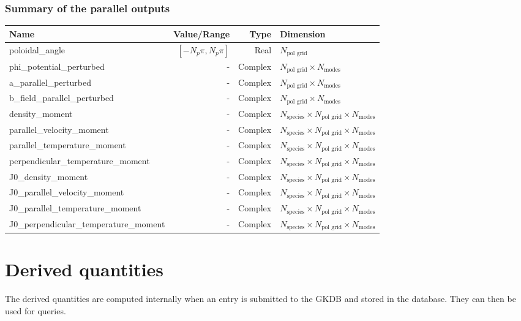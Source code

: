\documentclass[a4paper]{report}
\begin{document}
\subsection{Summary of the parallel outputs}
\begin{tabularx}{\textwidth}{|L|R|R|Y|}
\hline
Name & Value/Range & Type & Dimension \\
\hline
poloidal\_angle & $[-N_p\pi,N_p\pi]$ & Real & $N_\textrm{pol grid}$\\
phi\_potential\_perturbed & - & Complex & $N_\textrm{pol grid}\times N_\textrm{modes}$\\
a\_parallel\_perturbed & - & Complex & $N_\textrm{pol grid}\times N_\textrm{modes}$\\
b\_field\_parallel\_perturbed & - & Complex & $N_\textrm{pol grid}\times N_\textrm{modes}$\\ 
density\_moment & - & Complex & $N_\textrm{species}\times N_\textrm{pol grid}\times N_\textrm{modes}$\\
parallel\_velocity\_moment & - & Complex & $N_\textrm{species}\times N_\textrm{pol grid}\times N_\textrm{modes}$\\
parallel\_temperature\_moment & - & Complex & $N_\textrm{species}\times N_\textrm{pol grid}\times N_\textrm{modes}$\\
perpendicular\_temperature\_moment & - & Complex & $N_\textrm{species}\times N_\textrm{pol grid}\times N_\textrm{modes}$\\
J0\_density\_moment & - & Complex & $N_\textrm{species}\times N_\textrm{pol grid}\times N_\textrm{modes}$\\
J0\_parallel\_velocity\_moment & - & Complex & $N_\textrm{species}\times N_\textrm{pol grid}\times N_\textrm{modes}$\\
J0\_parallel\_temperature\_moment & - & Complex & $N_\textrm{species}\times N_\textrm{pol grid}\times N_\textrm{modes}$\\
J0\_perpendicular\_temperature\_moment & - & Complex & $N_\textrm{species}\times N_\textrm{pol grid}\times N_\textrm{modes}$\\
\hline
\end{tabularx}

\chapter{Derived quantities}
The derived quantities are computed internally when an entry is submitted to the GKDB and stored in the database. They can then be used for queries. 
\end{document}
